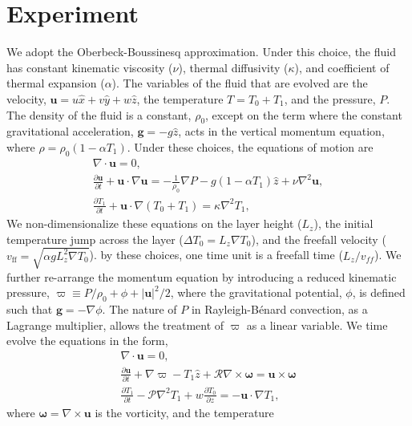 \documentclass[aps, pre, onecolumn, nofootinbib, notitlepage, groupedaddress, amsfonts, amssymb, amsmath, longbibliography]{revtex4-1}
\newcommand{\DivU}{\ensuremath{\nabla\cdot\bm{u}}}
\newcommand{\grad}{\ensuremath{\nabla}}
\newcommand{\RB}{Rayleigh-B\'{e}nard }
\begin{document}
\section{Experiment}
\label{sec:experiment}
We adopt the Oberbeck-Boussinesq approximation.  Under this choice, the
fluid has constant kinematic viscosity ($\nu$), thermal diffusivity ($\kappa$), and coefficient
of thermal expansion ($\alpha$). The variables of the fluid that are evolved are the velocity,
$\bm{u} = u\hat{x} + v\hat{y} + w\hat{z}$, the temperature $T = T_0 + T_1$, and the pressure, $P$.
The density of the fluid is a constant, $\rho_0$, except on the
term where the constant gravitational acceleration, $\bm{g} = - g\hat{z}$, acts in the vertical momentum equation, 
where $\rho = \rho_0(1  - \alpha T_1)$.  
Under these choices, the equations of motion are \cite{spiegel&veronis1960}
\begin{gather}
\DivU = 0, 
	\label{eqn:dim_incompressible}
\\
\frac{\partial \bm{u}}{\partial t} + \bm{u}\cdot\grad\bm{u} =
-\frac{1}{\rho_0}\grad P - g( 1 - \alpha T_1)\hat{z} + \nu\grad^2\bm{u}, 
	\label{eqn:dim_bouss_momentum}
\\
\frac{\partial T_1}{\partial t} + \bm{u}\cdot\grad(T_0 + T_1) = \kappa\grad^2 T_1,
	\label{eqn:dim_bouss_energy}
\end{gather}
We non-dimensionalize these equations on the layer height ($L_z$),
the initial temperature jump across the layer ($\Delta T_0 = L_z \grad T_0$), 
and the freefall velocity ($v_{\text{ff}} = \sqrt{\alpha g L_z^2 \grad T_0}$).
by these choices, one time unit is a freefall time ($L_z/v_{ff}$).
We further re-arrange the momentum equation by introducing a reduced kinematic pressure,
$\varpi \equiv P / \rho_0 + \phi + |\bm{u}|^2 / 2$, where the gravitational
potential, $\phi$, is defined such that $\bm{g} = -\grad \phi$.
The nature of $P$ in \RB convection, as a
Lagrange multiplier,
allows the treatment of $\varpi$ as a linear variable.
We time evolve the equations in the form,
\begin{gather}
\DivU = 0, 
	\label{eqn:incompressible}
\\
\frac{\partial \bm{u}}{\partial t} + \grad \varpi - T_1\hat{z} + \mathcal{R}\grad\times\bm{\omega} = \bm{u}\times\bm{\omega}
	\label{eqn:bouss_momentum}
\\
\frac{\partial T_1}{\partial t} - \mathcal{P}\grad^2 T_1 + w \frac{\partial T_0}{\partial z} = - \bm{u}\cdot\grad T_1,
	\label{eqn:bouss_energy}
\end{gather}
where $\bm{\omega} = \grad \times \bm{u}$ is the vorticity, and the temperature
\end{document}
